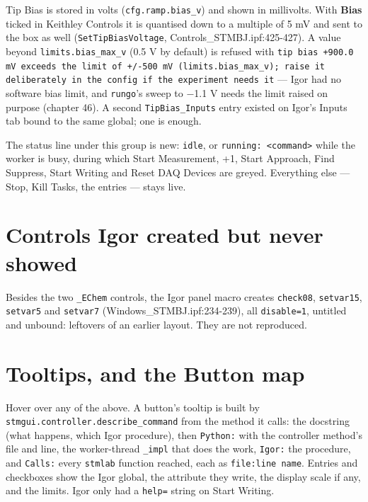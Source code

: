 Tip Bias is stored in volts (\texttt{cfg.\discretionary{}{}{}ramp.\discretionary{}{}{}bias\_\discretionary{}{}{}v}) and shown in millivolts. With \textbf{Bias} ticked in Keithley Controls it is quantised down to a multiple of 5 mV and sent to the box as well (\texttt{Set\discretionary{}{}{}Tip\discretionary{}{}{}Bias\discretionary{}{}{}Voltage}, Controls\_STMBJ.ipf:425-427). A value beyond \texttt{limits.\discretionary{}{}{}bias\_\discretionary{}{}{}max\_\discretionary{}{}{}v} (0.5 V by default) is refused with \texttt{tip bias +900.\discretionary{}{}{}0 m\discretionary{}{}{}V exceeds the limit of +/\discretionary{}{}{}-500 m\discretionary{}{}{}V (limits.\discretionary{}{}{}bias\_\discretionary{}{}{}max\_\discretionary{}{}{}v); raise it deliberately in the config if the experiment needs it} --- Igor had no software bias limit, and \texttt{rungo}'s sweep to −1.1 V needs the limit raised on purpose (chapter 46). A second \texttt{Tip\discretionary{}{}{}Bias\_\discretionary{}{}{}Inputs} entry existed on Igor's Inputs tab bound to the same global; one is enough.

The status line under this group is new: \texttt{idle}, or \texttt{running: <command>} while the worker is busy, during which Start Measurement, +1, Start Approach, Find Suppress, Start Writing and Reset DAQ Devices are greyed. Everything else --- Stop, Kill Tasks, the entries --- stays live.

\section{Controls Igor created but never showed}

Besides the two \texttt{\_\discretionary{}{}{}EChem} controls, the Igor panel macro creates \texttt{check08}, \texttt{setvar15}, \texttt{setvar5} and \texttt{setvar7} (Windows\_STMBJ.ipf:234-239), all \texttt{disable=1}, untitled and unbound: leftovers of an earlier layout. They are not reproduced.

\section{Tooltips, and the Button map}

Hover over any of the above. A button's tooltip is built by \texttt{stmgui.\discretionary{}{}{}controller.\discretionary{}{}{}describe\_\discretionary{}{}{}command} from the method it calls: the docstring (what happens, which Igor procedure), then \texttt{Python:} with the controller method's file and line, the worker-thread \texttt{\_\discretionary{}{}{}impl} that does the work, \texttt{Igor:} the procedure, and \texttt{Calls:} every \texttt{stmlab} function reached, each as \texttt{file:line name}. Entries and checkboxes show the Igor global, the attribute they write, the display scale if any, and the limits. Igor only had a \texttt{help=} string on Start Writing.

